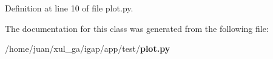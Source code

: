 \subsubsection{}\label{classapp_1_1test_1_1plot_1_1PlotPanel_9d12812bd9592e8573517d7413a3b371}




Definition at line 10 of file plot.py.

The documentation for this class was generated from the following file:\begin{CompactItemize}
\item 
/home/juan/xul\_\-ga/igap/app/test/{\bf plot.py}\end{CompactItemize}
